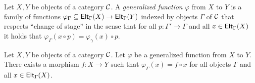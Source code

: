 \begin{definition}
  Let \(X,Y\) be objects of a category \(\mathcal C\).
  A \emph{generalized function} \(\varphi\) from \(X\) to \(Y\)
  is a family of functions
  \(\varphi_\Gamma \subseteq \mathsf{Elt}_{\Gamma}(X) \to \mathsf{Elt}_{\Gamma}(Y)\)
  indexed by objects \(\Gamma\) of \(\mathcal C\)
  that respects ``change of stage''
  in the sense that for all \(p : \Gamma' \to \Gamma\)
  and all \(x \in \mathsf{Elt}_{\Gamma}(X)\)
  it holds that \(\varphi_\Gamma(x\circ p) = \varphi_\gamma(x)\circ p\).
\end{definition}

\begin{proposition}
  \label{prop:generalized-elementwise-definition}
  Let \(X,Y\) be objects of a category \(\mathcal C\).
  Let \(\varphi\) be a generalized function from \(X\) to \(Y\).
  There exists a morphism \(f : X \to Y\)
  such that \(\varphi_\Gamma(x) = f \circ x\)
  for all objects \(\Gamma\) and all \(x \in \mathsf{Elt}_{\Gamma}(X)\).
\end{proposition}

